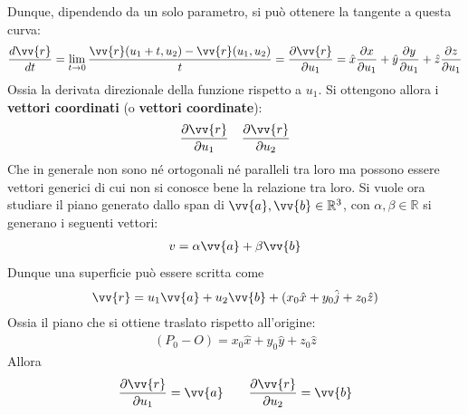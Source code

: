 \documentclass[a4paper, oneside]{article}
\begin{document}
Dunque, dipendendo da un solo parametro, si può ottenere la tangente a questa curva:
\begin{gather*}
    \frac{d\vv{r} }{dt} = \lim_{t \to 0} \frac{\vv{r}(u_1 + t, u_2) - \vv{r}(u_1 , u_2)  }{t} = \frac{\partial \vv{r} }{\partial u_1}   = \hat{x} \frac{\partial x}{\partial u_1} + \hat{y} \frac{\partial y}{\partial u_1} + \hat{z}\frac{\partial z}{\partial u_1}      
\end{gather*}
Ossia la derivata direzionale della funzione rispetto a $u_1$.  Si ottengono
allora i \textbf{vettori coordinati} (o \textbf{vettori coordinate}):
\begin{gather*}
    \frac{\partial \vv{r} }{\partial u_1} \quad \frac{\partial \vv{r} }{\partial u_2}  
\end{gather*}
Che in generale non sono né ortogonali né paralleli tra loro ma possono essere vettori generici 
di cui non si conosce bene la relazione tra loro. 
Si vuole ora studiare il piano generato dallo span
di $\vv{a}, \vv{b} \in \mathbb{R}^{3}$, con $\alpha, \beta \in \mathbb{R}$ si generano i seguenti vettori:
\begin{gather*}
    v = \alpha\vv{a} + \beta\vv{b} 
\end{gather*}  
Dunque una superficie può essere scritta come 
\begin{gather*}
    \vv{r}= u_1 \vv{a} + u_2 \vv{b}   + (x_0 \hat{x} + y_0 \hat{j} + z_0 \hat{z}   )
\end{gather*}
Ossia il piano che si ottiene traslato rispetto all'origine:
\begin{gather*}
    (P_0 - O) = x_0 \hat{x} + y_0 \hat{y} + z_0 \hat{z}   
\end{gather*}
Allora 
\begin{gather*}
    \frac{\partial \vv{r} }{\partial u_1 } = \vv{a} \qquad \frac{\partial \vv{r} }{\partial u_2} = \vv{b}    
\end{gather*}
\end{document}

